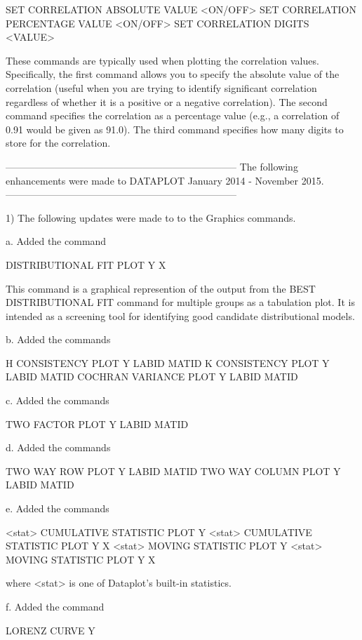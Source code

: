          SET CORRELATION ABSOLUTE VALUE <ON/OFF>
         SET CORRELATION PERCENTAGE VALUE <ON/OFF>
         SET CORRELATION DIGITS <VALUE>

     These commands are typically used when plotting the correlation values.
     Specifically, the first command allows you to specify the absolute
     value of the correlation (useful when you are trying to identify
     significant correlation regardless of whether it is a positive or a
     negative correlation).  The second command specifies the correlation
     as a percentage value (e.g., a correlation of 0.91 would be given as
     91.0).  The third command specifies how many digits to store for the
     correlation.

-----------------------------------------------------------------------
The following enhancements were made to DATAPLOT
January 2014 - November 2015.
-----------------------------------------------------------------------

 1) The following updates were made to to the Graphics commands.

    a. Added the command

         DISTRIBUTIONAL FIT PLOT Y X

       This command is a graphical represention of the output from the
       BEST DISTRIBUTIONAL FIT command for multiple groups as a tabulation
       plot.  It is intended as a screening tool for identifying good
       candidate distributional models.

    b. Added the commands

        H CONSISTENCY PLOT    Y LABID MATID
        K CONSISTENCY PLOT    Y LABID MATID
        COCHRAN VARIANCE PLOT Y LABID MATID

    c. Added the commands

        TWO FACTOR PLOT    Y LABID MATID

    d. Added the commands

        TWO WAY ROW PLOT     Y LABID MATID
        TWO WAY COLUMN PLOT  Y LABID MATID

    e. Added the commands

         <stat> CUMULATIVE STATISTIC PLOT Y
         <stat> CUMULATIVE STATISTIC PLOT Y X
         <stat> MOVING STATISTIC PLOT Y
         <stat> MOVING STATISTIC PLOT Y X

       where <stat> is one of Dataplot's built-in statistics.

    f. Added the command

         LORENZ CURVE Y

